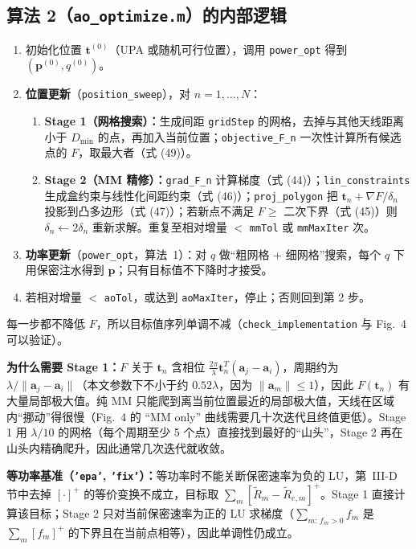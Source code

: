 \documentclass[11pt,a4paper]{ctexart}
\newcommand{\code}[1]{\texttt{#1}}
\newcommand{\bt}{\mathbf t}
\begin{document}
\subsection{算法 2（\code{ao\_optimize.m}）的内部逻辑}
\begin{enumerate}
\item 初始化位置 $\bt^{(0)}$（UPA 或随机可行位置），调用 \code{power\_opt} 得到 $(\mathbf p^{(0)},q^{(0)})$。
\item \textbf{位置更新}（\code{position\_sweep}），对 $n=1,\dots,N$：
  \begin{enumerate}
  \item \textbf{Stage 1（网格搜索）：}生成间距 \code{gridStep} 的网格，去掉与其他天线距离小于 $D_{\min}$ 的点，再加入当前位置；\code{objective\_F\_n} 一次性计算所有候选点的 $F$，取最大者（式 (49)）。
  \item \textbf{Stage 2（MM 精修）：}\code{grad\_F\_n} 计算梯度（式 (44)）；\code{lin\_constraints} 生成盒约束与线性化间距约束（式 (46)）；\code{proj\_polygon} 把 $\bt_n+\nabla F/\delta_n$ 投影到凸多边形（式 (47)）；若新点不满足 $F\ge$ 二次下界（式 (45)）则 $\delta_n\leftarrow2\delta_n$ 重新求解。重复至相对增量 $<$ \code{mmTol} 或 \code{mmMaxIter} 次。
  \end{enumerate}
\item \textbf{功率更新}（\code{power\_opt}，算法~1）：对 $q$ 做“粗网格 + 细网格”搜索，每个 $q$ 下用保密注水得到 $\mathbf p$；只有目标值不下降时才接受。
\item 若相对增量 $<$ \code{aoTol}，或达到 \code{aoMaxIter}，停止；否则回到第 2 步。
\end{enumerate}
每一步都不降低 $F$，所以目标值序列单调不减（\code{check\_implementation} 与 Fig.~4 可以验证）。

\textbf{为什么需要 Stage 1：}$F$ 关于 $\bt_n$ 含相位 $\frac{2\pi}{\lambda}\bt_n^T(\mathbf a_j-\mathbf a_i)$，周期约为 $\lambda/\|\mathbf a_j-\mathbf a_i\|$（本文参数下不小于约 $0.52\lambda$，因为 $\|\mathbf a_m\|\le1$），因此 $F(\bt_n)$ 有大量局部极大值。纯 MM 只能爬到离当前位置最近的局部极大值，天线在区域内“挪动”得很慢（Fig.~4 的 “MM only” 曲线需要几十次迭代且终值更低）。Stage 1 用 $\lambda/10$ 的网格（每个周期至少 5 个点）直接找到最好的“山头”，Stage 2 再在山头内精确爬升，因此通常几次迭代就收敛。

\textbf{等功率基准（\code{'epa'}, \code{'fix'}）：}等功率时不能关断保密速率为负的 LU，第~III-D 节中去掉 $[\cdot]^+$ 的等价变换不成立，目标取 $\sum_m[\tilde R_m-\tilde R_{e,m}]^+$。Stage 1 直接计算该目标；Stage 2 只对当前保密速率为正的 LU 求梯度（$\sum_{m:\,f_m>0}f_m$ 是 $\sum_m[f_m]^+$ 的下界且在当前点相等），因此单调性仍成立。
\end{document}
